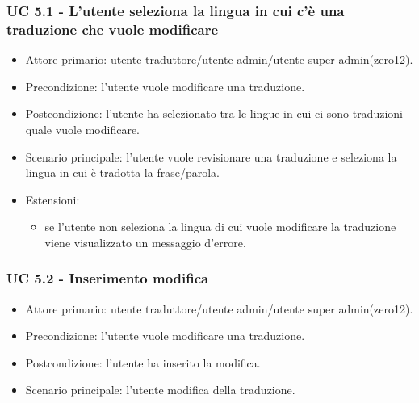     \subsubsection{UC 5.1 - L'utente seleziona la lingua in cui c'è una traduzione che vuole modificare}
        \begin{itemize}
            \item Attore primario: utente traduttore/utente admin/utente super admin(zero12).
            \item Precondizione: l'utente vuole modificare una traduzione.
            \item Postcondizione: l'utente ha selezionato tra le lingue in cui ci sono traduzioni quale vuole modificare.
            \item Scenario principale: l'utente vuole revisionare una traduzione e seleziona la lingua in cui è tradotta la frase/parola.
            \item Estensioni:
                \begin{itemize}
                    \item se l'utente non seleziona la lingua di cui vuole modificare la traduzione viene visualizzato un messaggio d'errore.
                \end{itemize}
        \end{itemize}
    \subsubsection{UC 5.2 - Inserimento modifica}
        \begin{itemize}
            \item Attore primario: utente traduttore/utente admin/utente super admin(zero12).
            \item Precondizione: l'utente vuole modificare una traduzione.
            \item Postcondizione: l'utente ha inserito la modifica.
            \item Scenario principale: l'utente modifica della traduzione.
        \end{itemize}
